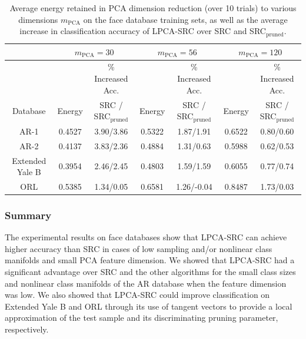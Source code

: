 \documentclass[review]{elsarticle}
\begin{document}
\begin{table}[!htb]
\small{
\centering
\begin{tabular}{|c|c|c|c|c|c|c|}
\hline
& \multicolumn{2}{|c|}{$m_{\mathrm{PCA}} = 30$} & \multicolumn{2}{|c|}{$m_{\mathrm{PCA}} = 56$} & \multicolumn{2}{|c|}{$m_{\mathrm{PCA}} = 120$} \\
\hline
 & 	 & \% Increased Acc. & 	 & \% Increased Acc. & 	 & \% Increased Acc. \\
Database & Energy	 & SRC / SRC$_\mathrm{pruned}$ & Energy & SRC / SRC$_\mathrm{pruned}$ &	Energy & SRC / SRC$_\mathrm{pruned}$ \\
\hline
AR-1	&	0.4527	& 3.90/3.86 &	0.5322	& 1.87/1.91 &	0.6522 & 0.80/0.60	\\
AR-2 	&	0.4137	& 3.83/2.36 &	0.4884	& 1.31/0.63 &	0.5988 & 0.62/0.53	\\
Extended Yale B	&	0.3954	& 2.46/2.45 &	 0.4803 & 1.59/1.59 	&	0.6055 & 0.77/0.74	\\
ORL	&	0.5385	& 1.34/0.05 &	0.6581	& 1.26/-0.04 &	0.8487 & 1.73/0.03	\\
\hline
\end{tabular}
\caption{Average energy retained in PCA dimension reduction (over 10 trials) to various dimensions $m_\mathrm{PCA}$ on the face database training sets, as well as the average increase in classification accuracy of LPCA-SRC over SRC and SRC$_\mathrm{pruned}$. } 
\label{tab:energy}}
\end{table}



\subsubsection{Summary} \label{sec:face_sum}

The experimental results on face databases show that LPCA-SRC can achieve higher accuracy than SRC in cases of low sampling and/or nonlinear class manifolds and small PCA feature dimension. We showed that LPCA-SRC had a significant advantage over SRC and the other algorithms for the small class sizes and nonlinear class manifolds of the AR database when the feature dimension was low. We also showed that LPCA-SRC could improve classification on Extended Yale B and ORL through its use of tangent vectors to provide a local approximation of the test sample and its discriminating pruning parameter, respectively. 
\end{document}
